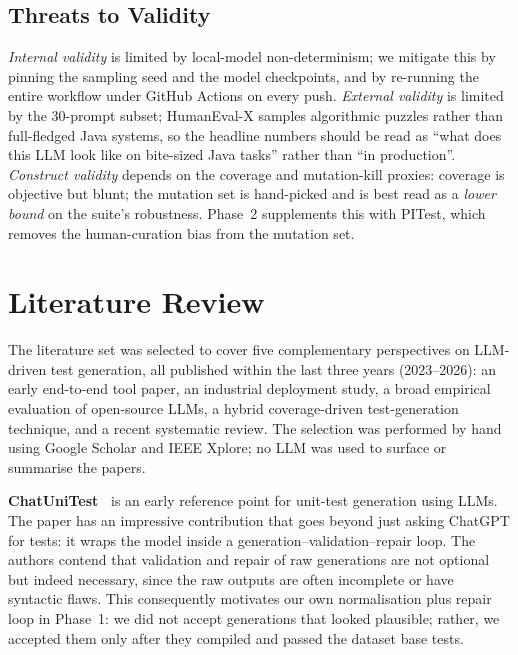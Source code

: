 \documentclass[journal]{IEEEtran}
\begin{document}
\subsection{Threats to Validity}

\emph{Internal validity} is limited by local-model non-determinism; we
mitigate this by pinning the sampling seed and the model checkpoints, and
by re-running the entire workflow under GitHub Actions on every push.
\emph{External validity} is limited by the 30-prompt subset; HumanEval-X
samples algorithmic puzzles rather than full-fledged Java systems, so the
headline numbers should be read as ``what does this LLM look like on
bite-sized Java tasks'' rather than ``in production''. \emph{Construct
validity} depends on the coverage and mutation-kill proxies: coverage is
objective but blunt; the mutation set is hand-picked and is best read as
a \emph{lower bound} on the suite's robustness. Phase~2 supplements this
with PITest, which removes the human-curation bias from the mutation set.

\section{Literature Review}\label{sec:lit}

The literature set was selected to cover five complementary perspectives
on LLM-driven test generation, all published within the last three years
(2023--2026): an early end-to-end tool paper, an industrial deployment
study, a broad empirical evaluation of open-source LLMs, a hybrid
coverage-driven test-generation technique, and a recent systematic
review. The selection was performed by hand using Google Scholar and IEEE
Xplore; no LLM was used to surface or summarise the papers.

\textbf{ChatUniTest~\cite{chatunitest}} is an early reference point for
unit-test generation using LLMs. The paper has an impressive contribution
that goes beyond just asking ChatGPT for tests: it wraps the model inside
a generation--validation--repair loop. The authors contend that
validation and repair of raw generations are not optional but indeed
necessary, since the raw outputs are often incomplete or have syntactic
flaws. This consequently motivates our own normalisation plus repair
loop in Phase~1: we did not accept generations that looked plausible;
rather, we accepted them only after they compiled and passed the dataset
base tests.
\end{document}

